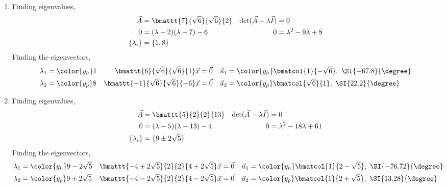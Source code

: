 \begin{enumerate}
    \item Finding eigenvalues,
          \begin{align}
              \vec{A}                        & = \bmattt{7}{\sqrt{6}}{\sqrt{6}}{2} &
              \det(\vec{A} - \lambda\vec{I}) & = 0                                   \\
              0                              & = (\lambda - 2)(\lambda - 7) - 6    &
              0                              & = \lambda^2 - 9 \lambda + 8           \\
              \{\lambda_i\}                  & = \{ 1, 8 \}
          \end{align}
          Finding the eigenvectors,
          \begin{align}
              \lambda_1                                   & = \color{y_h} 1 &
              \bmattt{6}{\sqrt{6}}{\sqrt{6}}{1} \vec{x}   & = \vec{0}       &
              \vec{u}_1                                   & = \color{y_h}
              \bmatcol{1}{-\sqrt{6}},\ \SI{-67.8}{\degree}                    \\
              \lambda_2                                   & = \color{y_p} 8 &
              \bmattt{-1}{\sqrt{6}}{\sqrt{6}}{-6} \vec{x} & = \vec{0}       &
              \vec{u}_2                                   & = \color{y_p}
              \bmatcol{\sqrt{6}}{1},\ \SI{22.2}{\degree}
          \end{align}

    \item Finding eigenvalues,
          \begin{align}
              \vec{A}                        & = \bmattt{5}{2}{2}{13}            &
              \det(\vec{A} - \lambda\vec{I}) & = 0                                 \\
              0                              & = (\lambda - 5)(\lambda - 13) - 4 &
              0                              & = \lambda^2 - 18 \lambda + 61       \\
              \{\lambda_i\}                  & = \{ 9 \pm 2\sqrt{5} \}
          \end{align}
          Finding the eigenvectors,
          \begin{align}
              \lambda_1                     & = \color{y_h} 9 - 2\sqrt{5} &
              \bmattt{-4 + 2\sqrt{5}}
              {2}{2}{4 + 2\sqrt{5}} \vec{x} & = \vec{0}                   &
              \vec{u}_1                     & = \color{y_h}
              \bmatcol{1}{2 - \sqrt{5}},\ \SI{-76.72}{\degree}              \\
              \lambda_2                     & = \color{y_p} 9 + 2\sqrt{5} &
              \bmattt{-4 - 2\sqrt{5}}
              {2}{2}{4 - 2\sqrt{5}} \vec{x} & = \vec{0}                   &
              \vec{u}_2                     & = \color{y_p}
              \bmatcol{1}{2 + \sqrt{5}},\ \SI{13.28}{\degree}
          \end{align}


\end{enumerate}
